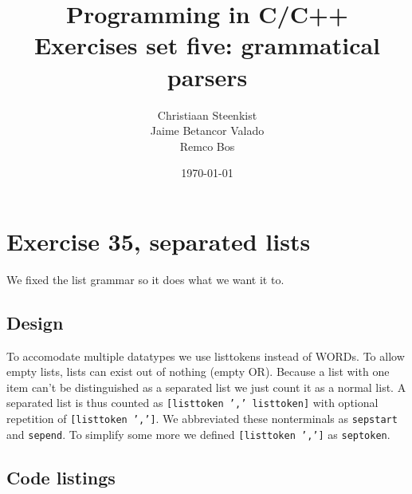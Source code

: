 \documentclass[11pt]{article}
\begin{document}
\title{Programming in C/C++ \\
       Exercises set five: grammatical parsers
}
\date{\today}
\author{Christiaan Steenkist \\
Jaime Betancor Valado \\
Remco Bos \\
}

\maketitle
\section*{Exercise 35, separated lists}
We fixed the list grammar so it does what we want it to.

\subsection*{Design}
To accomodate multiple datatypes we use listtokens instead of WORDs.
To allow empty lists, lists can exist out of nothing (empty OR).
Because a list with one item can't be distinguished as a separated list we just count it as a normal list.
A separated list is thus counted as \texttt{[listtoken ',' listtoken]} with optional repetition of \texttt{[listtoken ',']}.
We abbreviated these nonterminals as \texttt{sepstart} and \texttt{sepend}.
To simplify some more we defined \texttt{[listtoken ',']} as \texttt{septoken}.

\subsection*{Code listings}

\end{document}
